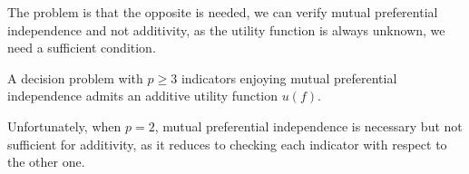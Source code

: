 The problem is that the opposite is needed, we can verify mutual preferential independence and not additivity, as the utility function is always unknown, we need a sufficient condition. \\

\begin{theo}
	A decision problem with $p \geq 3$ indicators enjoying mutual preferential independence admits an additive utility function $u(f)$.
\end{theo}

Unfortunately, when $p=2$, mutual preferential independence is necessary but not sufficient for additivity, as it reduces to checking each indicator with respect to the other one.

